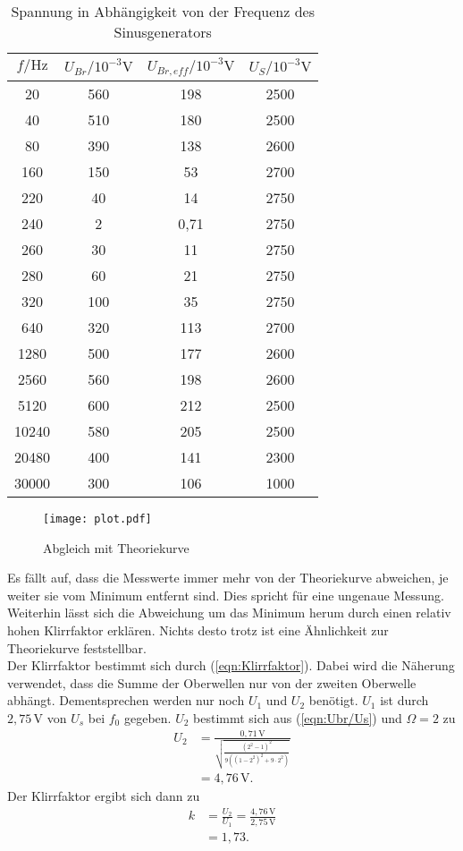 \begin{table}
  \centering
  \caption{Spannung in Abhängigkeit von der Frequenz des Sinusgenerators}
  \label{tab:Wien-Robinson}
  \begin{tabular}{c c c c}
    \toprule
    $f/\unit{\hertz}$ & $ U_{Br}/10^{-3}\unit{\volt}$ & $U_{Br,eff}/10^{-3}\unit{\volt}$ & $U_{S}/10^{-3}\unit{\volt}$ \\
    \midrule
       20 & 560 & 198   & 2500 \\
       40 & 510 & 180   & 2500 \\
       80 & 390 & 138   & 2600 \\
      160 & 150 &  53   & 2700 \\
      220 &  40 &  14   & 2750 \\
      240 &   2 &  0,71 & 2750 \\
      260 &  30 &  11   & 2750 \\
      280 &  60 &  21   & 2750 \\
      320 & 100 &  35   & 2750 \\
      640 & 320 & 113   & 2700 \\
     1280 & 500 & 177   & 2600 \\
     2560 & 560 & 198   & 2600 \\
     5120 & 600 & 212   & 2500 \\
    10240 & 580 & 205   & 2500 \\
    20480 & 400 & 141   & 2300 \\
    30000 & 300 & 106   & 1000 \\
    \bottomrule
  \end{tabular}
\end{table}

\begin{figure}
  \centering
  \texttt{[image: plot.pdf]}
  \caption{Abgleich mit Theoriekurve}
  \label{fig:plot}
\end{figure}
Es fällt auf, dass die Messwerte immer mehr von der Theoriekurve abweichen, je weiter sie vom Minimum entfernt sind. Dies spricht für eine ungenaue Messung.
Weiterhin lässt sich die Abweichung um das Minimum herum durch einen relativ hohen Klirrfaktor erklären. Nichts desto trotz ist eine Ähnlichkeit zur Theoriekurve
feststellbar.
\\
Der Klirrfaktor bestimmt sich durch (\ref{eqn:Klirrfaktor}). Dabei wird die Näherung verwendet, dass die Summe der Oberwellen nur von der zweiten Oberwelle abhängt. Dementsprechen werden
nur noch $U_1$ und $U_2$ benötigt. $U_1$ ist durch $2,75\,\unit{\volt}$ von $U_s$ bei $f_0$ gegeben. $U_2$ bestimmt sich aus (\ref{eqn:Ubr/Us}) und $\Omega = 2$ zu
\begin{align*}
  U_2 &= \frac{0,71\,\unit{\volt}}{\sqrt{\frac{(2^2 -1)^2}{9((1-2^2)^2 +9\cdot2^2)}}}\\
 &= 4,76\,\unit{\volt}.
\end{align*}
Der Klirrfaktor ergibt sich dann zu
\begin{align*}
  k &= \frac{U_2}{U_1} = \frac{4,76\,\unit{\volt}}{2,75\,\unit{\volt}} \\
  &= 1,73.
\end{align*}